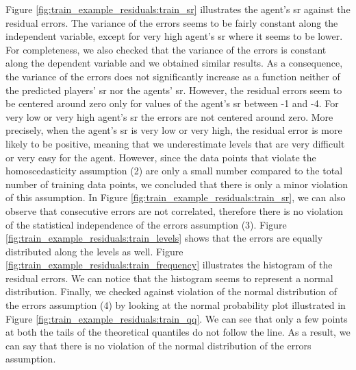 Figure \ref{fig:train_example_residuals:train_sr} illustrates the agent's \acs{sr} against the residual errors. The variance of the errors seems to be fairly constant along the independent variable, except for very high agent's \acs{sr} where it seems to be lower. For completeness, we also checked that the variance of the errors is constant along the dependent variable and we obtained similar results. As a consequence, the variance of the errors does not significantly increase as a function neither of the predicted players’ \acs{sr} nor the agents’ \acs{sr}. However, the residual errors seem to be centered around zero only for values of the agent's \acs{sr} between -1 and -4. For very low or very high agent's \acs{sr} the errors are not centered around zero. More precisely, when the agent's \acs{sr} is very low or very high, the residual error is more likely to be positive, meaning that we underestimate levels that are very difficult or very easy for the agent. 
However, since the data points that violate the homoscedasticity assumption (2) are only a small number compared to the total number of training data points, we concluded that there is only a minor violation of this assumption.
In Figure \ref{fig:train_example_residuals:train_sr}, we can also observe that consecutive errors are not correlated, therefore there is no violation of the statistical independence of the errors assumption (3). Figure \ref{fig:train_example_residuals:train_levels} shows that the errors are equally distributed along the levels as well.
Figure \ref{fig:train_example_residuals:train_frequency} illustrates the histogram of the residual errors. We can notice that the histogram seems to represent a normal distribution. Finally, we checked against violation of the normal distribution of the errors assumption (4) by looking at the normal probability plot \cite{chambers_assessing_1983} illustrated in Figure \ref{fig:train_example_residuals:train_qq}. We can see that only a few points at both the tails of the theoretical quantiles do not follow the line.
As a result, we can say that there is no violation of the normal distribution of the errors assumption.  

